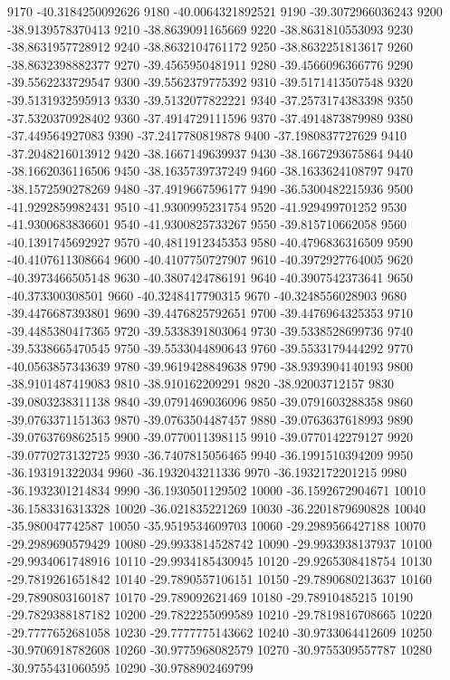 {9170 -40.3184250092626
9180 -40.0064321892521
9190 -39.3072966036243
9200 -38.9139578370413
9210 -38.8639091165669
9220 -38.8631810553093
9230 -38.8631957728912
9240 -38.8632104761172
9250 -38.8632251813617
9260 -38.8632398882377
9270 -39.4565950481911
9280 -39.4566096366776
9290 -39.5562233729547
9300 -39.5562379775392
9310 -39.5171413507548
9320 -39.5131932595913
9330 -39.5132077822221
9340 -37.2573174383398
9350 -37.5320370928402
9360 -37.4914729111596
9370 -37.4914873879989
9380 -37.449564927083
9390 -37.2417780819878
9400 -37.1980837727629
9410 -37.2048216013912
9420 -38.1667149639937
9430 -38.1667293675864
9440 -38.1662036116506
9450 -38.1635739737249
9460 -38.1633624108797
9470 -38.1572590278269
9480 -37.4919667596177
9490 -36.5300482215936
9500 -41.9292859982431
9510 -41.9300995231754
9520 -41.929499701252
9530 -41.9300683836601
9540 -41.9300825733267
9550 -39.815710662058
9560 -40.1391745692927
9570 -40.4811912345353
9580 -40.4796836316509
9590 -40.4107611308664
9600 -40.4107750727907
9610 -40.3972927764005
9620 -40.3973466505148
9630 -40.3807424786191
9640 -40.3907542373641
9650 -40.373300308501
9660 -40.3248417790315
9670 -40.3248556028903
9680 -39.4476687393801
9690 -39.4476825792651
9700 -39.4476964325353
9710 -39.4485380417365
9720 -39.5338391803064
9730 -39.5338528699736
9740 -39.5338665470545
9750 -39.5533044890643
9760 -39.5533179444292
9770 -40.0563857343639
9780 -39.9619428849638
9790 -38.9393904140193
9800 -38.9101487419083
9810 -38.910162209291
9820 -38.92003712157
9830 -39.0803238311138
9840 -39.0791469036096
9850 -39.0791603288358
9860 -39.0763371151363
9870 -39.0763504487457
9880 -39.0763637618993
9890 -39.0763769862515
9900 -39.0770011398115
9910 -39.0770142279127
9920 -39.0770273132725
9930 -36.7407815056465
9940 -36.1991510394209
9950 -36.193191322034
9960 -36.1932043211336
9970 -36.1932172201215
9980 -36.1932301214834
9990 -36.1930501129502
10000 -36.1592672904671
10010 -36.1583316313328
10020 -36.021835221269
10030 -36.2201879690828
10040 -35.980047742587
10050 -35.9519534609703
10060 -29.2989566427188
10070 -29.2989690579429
10080 -29.9933814528742
10090 -29.9933938137937
10100 -29.9934061748916
10110 -29.9934185430945
10120 -29.9265308418754
10130 -29.7819261651842
10140 -29.7890557106151
10150 -29.7890680213637
10160 -29.7890803160187
10170 -29.789092621469
10180 -29.78910485215
10190 -29.7829388187182
10200 -29.7822255099589
10210 -29.7819816708665
10220 -29.7777652681058
10230 -29.7777775143662
10240 -30.9733064412609
10250 -30.9706918782608
10260 -30.9775968082579
10270 -30.9755309557787
10280 -30.9755431060595
10290 -30.9788902469799
}
